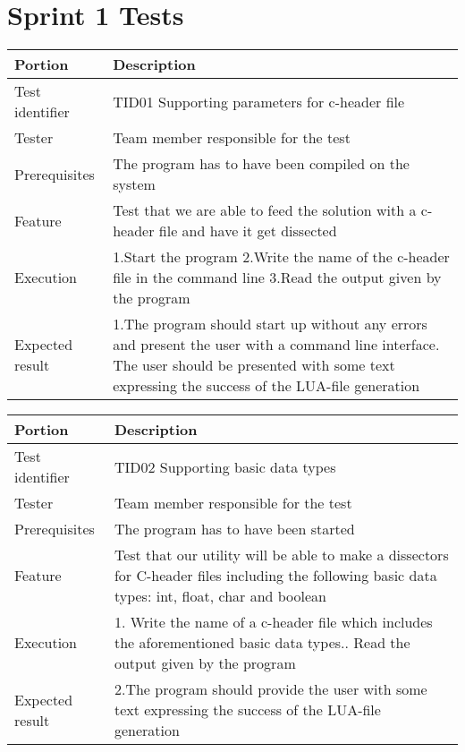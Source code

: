 \section{Sprint 1 Tests}
\begin{table}[H]
\begin{tabularx}{\textwidth}{l X}
\hline\hline
Portion & Description\\[0.5ex]
\hline
Test identifier & TID01 Supporting parameters for c-header file\\[0.5ex]
Tester & Team member responsible for the test\\[0.5ex]
Prerequisites & The program has to have been compiled on the system\\[0.5ex]
Feature & Test that we are able to feed the solution with a c-header file and have it get dissected\\
Execution & 1.Start the program\newline
		2.Write the name of the c-header file in the command line\newline
		 3.Read the output given by the program\\ 
Expected result & 1.The program should start up without any errors and present the user with a command line interface\newline
3. The user should be presented with some text expressing the success of the LUA-file generation\\[0.5ex]
\hline\hline
\end{tabularx}


\begin{tabularx}{\textwidth}{l X}
\hline\hline
Portion & Description\\[0.5ex]
\hline
Test identifier & TID02 Supporting basic data types\\[0.5ex]
Tester & Team member responsible for the test\\[0.5ex]
Prerequisites & The program has to have been started\\[0.5ex]
Feature & Test that our utility will be able to make a dissectors for C-header files including the following basic data types: int, float, char and boolean \\
Execution & 1. Write the name of a c-header file which includes the aforementioned basic data types.\newline
		2. Read the output given by the program\\ 
Expected result & 2.The program should provide the user with some text expressing the success of the LUA-file generation\\[0.5ex]
\hline\hline
\end{tabularx}



\end{table}
